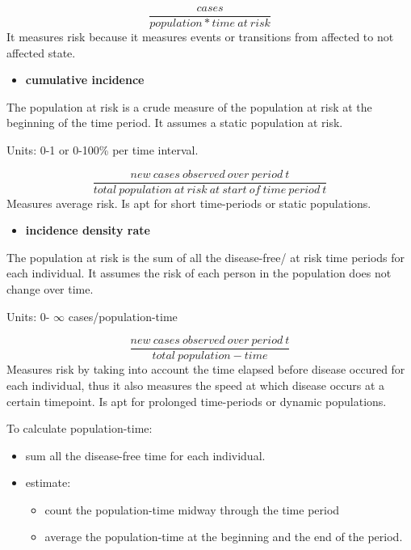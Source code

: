 \documentclass[
]{article}
\providecommand{\tightlist}{%
  \setlength{\itemsep}{0pt}\setlength{\parskip}{0pt}}
\begin{document}
\[\frac{cases}{population*time\:at\:risk}\] It measures risk because it
measures events or transitions from affected to not affected state.

\begin{itemize}
\tightlist
\item
  \textbf{cumulative incidence}
\end{itemize}

The population at risk is a crude measure of the population at risk at
the beginning of the time period. It assumes a static population at
risk.

Units: 0-1 or 0-100\% per time interval.

\[\frac{new\:cases\:observed\:over\:period\:t}{total\:population\:at\:risk\:at\:start\:of\:time\:period\:t}\]
Measures average risk. Is apt for short time-periods or static
populations.

\begin{itemize}
\tightlist
\item
  \textbf{incidence density rate}
\end{itemize}

The population at risk is the sum of all the disease-free/ at risk time
periods for each individual. It assumes the risk of each person in the
population does not change over time.

Units: 0- \(\infty\) cases/population-time

\[\frac{new\:cases\:observed\:over\:period\:t}{total\:population-time}\]
Measures risk by taking into account the time elapsed before disease
occured for each individual, thus it also measures the speed at which
disease occurs at a certain timepoint. Is apt for prolonged time-periods
or dynamic populations.

To calculate population-time:

\begin{itemize}
\tightlist
\item
  sum all the disease-free time for each individual.
\item
  estimate:

  \begin{itemize}
  \tightlist
  \item
    count the population-time midway through the time period
  \item
    average the population-time at the beginning and the end of the
    period.
  \end{itemize}
\end{itemize}
\end{document}
